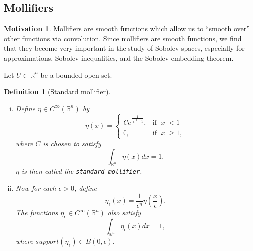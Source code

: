 \documentclass[11pt]{article}
\newtheorem{definition}{Definition}
\theoremstyle{definition}
\newtheorem*{motivation}{Motivation}
\begin{document}
\subsection{Mollifiers}
\begin{motivation}
	Mollifiers are smooth functions which allow us to ``smooth over'' other functions via convolution.
	Since mollifiers are smooth functions, we find that they become very important in the study of Sobolev spaces,
	especially for approximations, Sobolev inequalities, and the Sobolev embedding theorem.
\end{motivation}
Let $U \subset \mathbb{R}^n$ be a bounded open set.
\begin{definition}[Standard mollifier]~ 
	\begin{enumerate}[(i)]
		\item Define $\eta \in C^{\infty}(\mathbb{R}^n)$ by
			\begin{equation*}
				\eta(x) =
				\begin{cases}
					C e^{\frac{1}{|x|^2 - 1}},& \text{if } |x| < 1 \\
					0,& \text{if } |x| \geq 1,
				\end{cases}
			\end{equation*}
			where $C$ is chosen to satisfy
			\begin{equation*}
				\int_{\mathbb{R}^n}{\eta(x)dx} = 1.
			\end{equation*}
			$\eta$ is then called the \texttt{standard mollifier}.
		\item Now for each $\epsilon > 0$, define
			\begin{equation*}
				\eta_{\epsilon}(x) = \frac{1}{\epsilon^n}\eta\left(\frac{x}{\epsilon}\right).
			\end{equation*}
			The functions $\eta_{\epsilon} \in C^{\infty}(\mathbb{R}^n)$ also satisfy
			\begin{equation*}
				\int_{\mathbb{R}^n}{\eta_{\epsilon}(x)dx} = 1,
			\end{equation*}
			where $support(\eta_{\epsilon}) \in B(0,\epsilon)$.
	\end{enumerate}
\end{definition}
\end{document}
